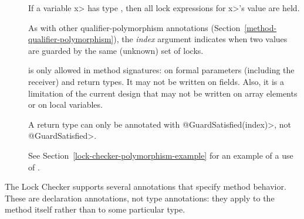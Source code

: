 \begin{description}

\item[]
  If a variable \<x> has type , then all
  lock expressions for \<x>'s value are held.

  As with other qualifier-polymorphism annotations
  (Section~\ref{method-qualifier-polymorphism}), the \emph{index} argument
  indicates when two values are guarded by the same (unknown) set of locks.

   is only allowed in method signatures:  on
  formal parameters (including the receiver) and return types.
  It may not be written on fields.  Also, it is a limitation of the
  current design that  may not be written on
  array elements or on local variables.

  A return type can only be annotated with \<@GuardSatisfied(index)>,
  not \<@GuardSatisfied>.

  See Section~\ref{lock-checker-polymorphism-example}
  for an example of a use of .


\end{description}



The Lock Checker supports several annotations that specify method behavior.
These are declaration annotations, not type annotations: they apply to the
method itself rather than to some particular type.


